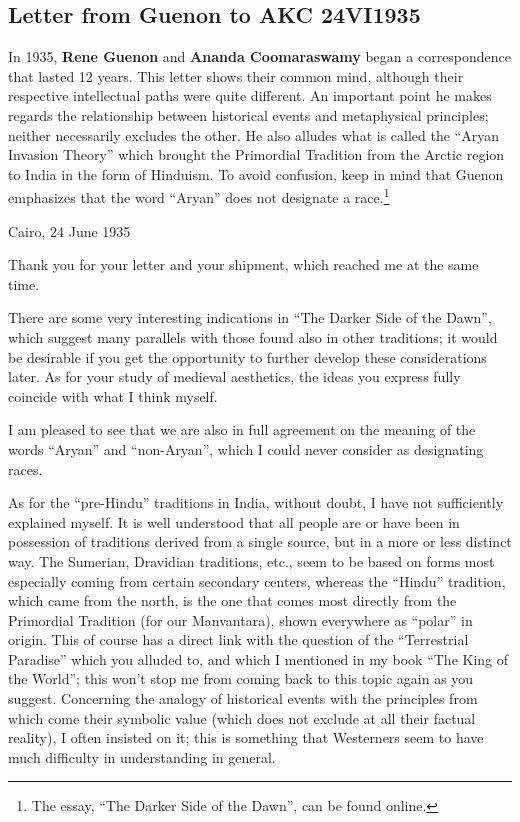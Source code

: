 \subsection{Letter from Guenon to AKC 24VI1935}

\begin{quotex}
In 1935, \textbf{Rene Guenon} and \textbf{Ananda Coomaraswamy} began a correspondence that lasted 12 years. This letter shows their common mind, although their respective intellectual paths were quite different. An important point he makes regards the relationship between historical events and metaphysical principles; neither necessarily excludes the other. He also alludes what is called the ``Aryan Invasion Theory'' which brought the Primordial Tradition from the Arctic region to India in the form of Hinduism. To avoid confusion, keep in mind that Guenon emphasizes that the word ``Aryan'' does not designate a race.\footnote{The essay, ``The Darker Side of the Dawn'', can be found online.}
\end{quotex}


Cairo, 24 June 1935

Thank you for your letter and your shipment, which reached me at the same time.

There are some very interesting indications in ``The Darker Side of the Dawn'', which suggest many parallels with those found also in other traditions; it would be desirable if you get the opportunity to further develop these considerations later. As for your study of medieval aesthetics, the ideas you express fully coincide with what I think myself.

I am pleased to see that we are also in full agreement on the meaning of the words ``Aryan'' and ``non-Aryan'', which I could never consider as designating races.

As for the ``pre-Hindu'' traditions in India, without doubt, I have not sufficiently explained myself. It is well understood that all people are or have been in possession of traditions derived from a single source, but in a more or less distinct way. The Sumerian, Dravidian traditions, etc., seem to be based on forms most especially coming from certain secondary centers, whereas the ``Hindu'' tradition, which came from the north, is the one that comes most directly from the Primordial Tradition (for our Manvantara), shown everywhere as ``polar'' in origin. This of course has a direct link with the question of the ``Terrestrial Paradise'' which you alluded to, and which I mentioned in my book ``The King of the World''; this won't stop me from coming back to this topic again as you suggest. Concerning the analogy of historical events with the principles from which come their symbolic value (which does not exclude at all their factual reality), I often insisted on it; this is something that Westerners seem to have much difficulty in understanding in general.

